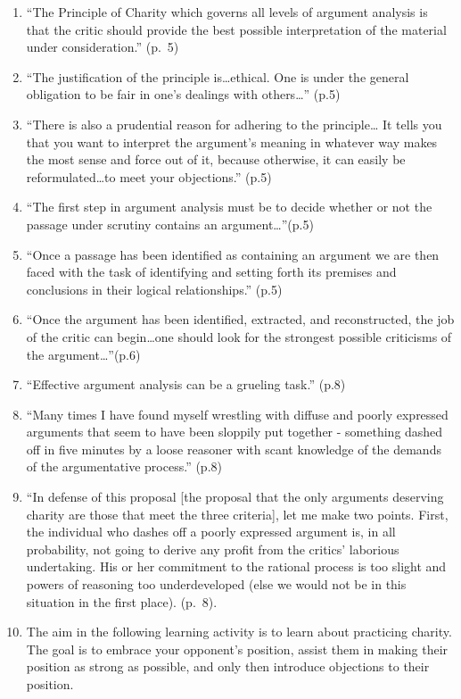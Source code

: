 \documentclass[
]{book}
\providecommand{\tightlist}{%
  \setlength{\itemsep}{0pt}\setlength{\parskip}{0pt}}
\begin{document}
\begin{enumerate}
\def\labelenumi{\arabic{enumi}.}
\tightlist
\item
  ``The Principle of Charity which governs all levels of argument analysis is that the critic should provide the best possible interpretation of the material under consideration.'' (p.~5)\\
\item
  ``The justification of the principle is\ldots ethical. One is under the general obligation to be fair in one's dealings with others\ldots{}'' (p.5)\\
\item
  ``There is also a prudential reason for adhering to the principle\ldots{} It tells you that you want to interpret the argument's meaning in whatever way makes the most sense and force out of it, because otherwise, it can easily be reformulated\ldots to meet your objections.'' (p.5)\\
\item
  ``The first step in argument analysis must be to decide whether or not the passage under scrutiny contains an argument\ldots{}''(p.5)\\
\item
  ``Once a passage has been identified as containing an argument we are then faced with the task of identifying and setting forth its premises and conclusions in their logical relationships.'' (p.5)\\
\item
  ``Once the argument has been identified, extracted, and reconstructed, the job of the critic can begin\ldots one should look for the strongest possible criticisms of the argument\ldots{}''(p.6)\\
\item
  ``Effective argument analysis can be a grueling task.'' (p.8)\\
\item
  ``Many times I have found myself wrestling with diffuse and poorly expressed arguments that seem to have been sloppily put together - something dashed off in five minutes by a loose reasoner with scant knowledge of the demands of the argumentative process.'' (p.8)\\
\item
  ``In defense of this proposal {[}the proposal that the only arguments deserving charity are those that meet the three criteria{]}, let me make two points. First, the individual who dashes off a poorly expressed argument is, in all probability, not going to derive any profit from the critics' laborious undertaking. His or her commitment to the rational process is too slight and powers of reasoning too underdeveloped (else we would not be in this situation in the first place). (p.~8).\\
\item
  The aim in the following learning activity is to learn about practicing charity. The goal is to embrace your opponent's position, assist them in making their position as strong as possible, and only then introduce objections to their position.
\end{enumerate}
\end{document}
